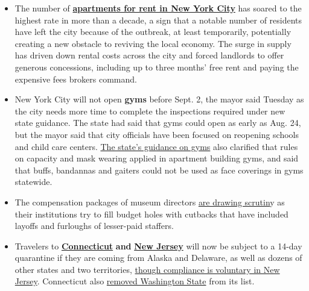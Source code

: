 \begin{itemize}
\tightlist
\item
  The number of
  \textbf{\href{https://www.nytimes3xbfgragh.onion/2020/08/18/nyregion/nyc-vacant-apartments.html?action=click\&module=Top\%20Stories\&pgtype=Homepage}{apartments
  for rent in New York City}} has soared to the highest rate in more
  than a decade, a sign that a notable number of residents have left the
  city because of the outbreak, at least temporarily, potentially
  creating a new obstacle to reviving the local economy. The surge in
  supply has driven down rental costs across the city and forced
  landlords to offer generous concessions, including up to three months'
  free rent and paying the expensive fees brokers command.
\end{itemize}

\begin{itemize}
\item
  New York City will not open \textbf{gyms} before Sept. 2, the mayor
  said Tuesday as the city needs more time to complete the inspections
  required under new state guidance. The state had said that gyms could
  open as early as Aug. 24, but the mayor said that city officials have
  been focused on reopening schools and child care centers.
  \href{https://www.governor.ny.gov/sites/governor.ny.gov/files/atoms/files/Gyms_and_Fitness_Centers_Summary_Guidelines.pdf}{The
  state's guidance on gyms} also clarified that rules on capacity and
  mask wearing applied in apartment building gyms, and said that buffs,
  bandannas and gaiters could not be used as face coverings in gyms
  statewide.
\item
  The compensation packages of museum directors
  \href{https://www.nytimes3xbfgragh.onion/2020/08/18/arts/design/museum-leader-salaries-pay-disparity.html}{are
  drawing scrutin}y as their institutions try to fill budget holes with
  cutbacks that have included layoffs and furloughs of lesser-paid
  staffers.
\item
  Travelers to
  \textbf{\href{https://portal.ct.gov/Coronavirus/Travel}{Connecticut}}
  \textbf{and}
  \textbf{\href{https://twitter.com/GovMurphy/status/1295758529014509569}{New
  Jersey}} will now be subject to a 14-day quarantine if they are coming
  from Alaska and Delaware, as well as dozens of other states and two
  territories,
  \href{https://covid19.nj.gov/faqs/nj-information/travel-and-transportation/which-states-are-on-the-travel-advisory-list-are-there-travel-restrictions-to-or-from-new-jersey}{though
  compliance is voluntary in New Jersey}. Connecticut also
  \href{https://twitter.com/GovNedLamont/status/1295749152375222272}{removed
  Washington State} from its list.
\end{itemize}

